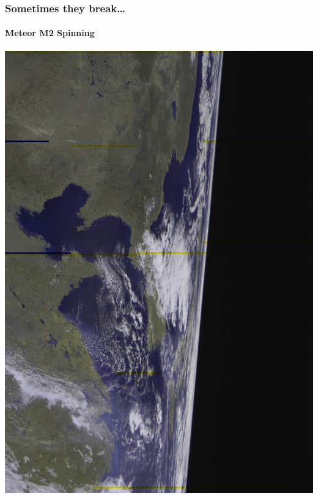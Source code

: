 \documentclass[]{beamer}
\begin{document}
\begin{frame}
    \frametitle{Sometimes they break\dots}
    \framesubtitle{Meteor M2 Spinning}
    \begin{center}
        \includegraphics[width=0.75\paperwidth,height=0.75\paperheight,keepaspectratio]{images/meteor-spin.jpg}
    \end{center}
\end{frame}
\end{document}
